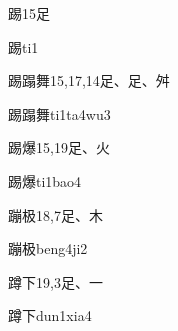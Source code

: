 \begin{entry}{踢}{15}{⾜}
  \begin{phonetics}{踢}{ti1}
  \end{phonetics}
\end{entry}

\begin{entry}{踢蹋舞}{15,17,14}{⾜、⾜、⾇}
  \begin{phonetics}{踢蹋舞}{ti1ta4wu3}
  \end{phonetics}
\end{entry}

\begin{entry}{踢爆}{15,19}{⾜、⽕}
  \begin{phonetics}{踢爆}{ti1bao4}
  \end{phonetics}
\end{entry}

\begin{entry}{蹦极}{18,7}{⾜、⽊}
  \begin{phonetics}{蹦极}{beng4ji2}
  \end{phonetics}
\end{entry}

\begin{entry}{蹲下}{19,3}{⾜、⼀}
  \begin{phonetics}{蹲下}{dun1xia4}
  \end{phonetics}
\end{entry}


